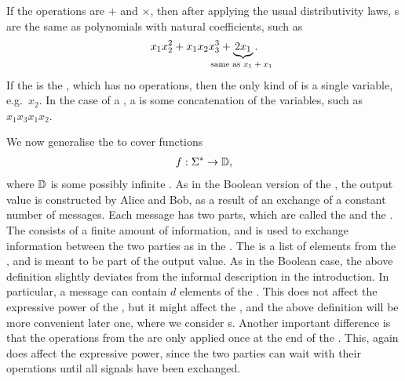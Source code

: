 \begin{myexample}
    If the operations are $+$ and $\times$, then after applying the usual distributivity laws,   s are the same as polynomials with natural coefficients, such as 
\begin{align*}
x_1x_2^2 + x_1x_2x_3^3  + \myunderbrace{2x_1}{same as $x_1 + x_1$}.
\end{align*}
If the  is the , which has no operations, then the only kind of  is a single variable, e.g.~$x_2$.  In the case of a , a  is some concatenation of the variables, such as $x_1 x_3 x_1 x_2$.
\end{myexample}



We now generalise the  to cover functions 
\begin{align*}
f : \Sigma^* \to \mathbb D,
\end{align*}
where $\mathbb D$ is some possibly infinite . As in the Boolean
version of the , the output value is constructed by Alice and Bob, as a
result of an exchange of a constant number of messages. Each message has two
parts, which are called the  and the . The
 consists of a finite amount of information, and is used to exchange
information between the two parties as in the . The 
is a list of elements from the  , and  is meant to be part of the
output value. As in the Boolean case, the above definition slightly deviates
from the informal description in the introduction. In particular, a message can
contain $d$ elements of the . This does not affect the expressive
power of the , but it might affect the , and the above
definition will be more convenient later one, where we consider s. Another important difference is that the operations from the  are only applied once at the end of the . This, again does
affect the expressive power, since the two parties can wait with their
operations until all signals have been exchanged.  

